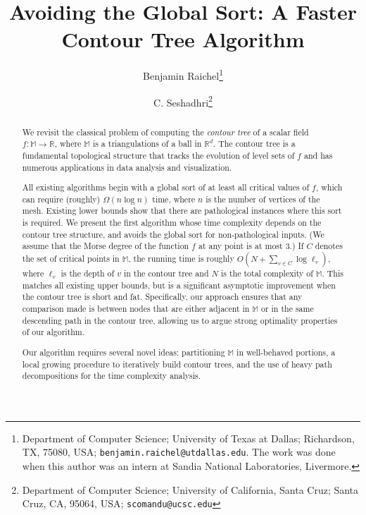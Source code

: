 \documentclass[11pt]{article}
\theoremstyle{definition}
\newcommand{\MM}{\mathbb{M}}
\newcommand{\RR}{\mathbb{R}}
\newcommand{\si}[1]{#1}
\begin{document}
\author{
  Benjamin Raichel\thanks{%
      Department of Computer Science; %
      University of Texas at Dallas; %
      Richardson, TX, 75080, USA; %
      \texttt{\si{benjamin.raichel}@\si{utdallas}.\si{edu}}.
  The work was done when this author was an intern
  at Sandia National Laboratories, Livermore.}
  \and
  C. Seshadhri\thanks{%
        Department of Computer Science; %
      University of California, Santa Cruz; %
      Santa Cruz, CA, 95064, USA; %
      \texttt{\si{scomandu}@\si{ucsc}.\si{edu}} %
  }
}

\title{%
Avoiding the Global Sort: 
\break A Faster Contour Tree Algorithm%
}
\date{}

\maketitle
\thispagestyle{empty}


\begin{abstract}
We revisit the classical problem of computing the \emph{contour tree}
of a scalar field $f:\MM \to \RR$, where $\MM$ 
is a triangulations of a ball in $\RR^d$.
The contour tree is a fundamental topological structure that tracks
the evolution of level sets of $f$ and 
has numerous applications in data analysis and visualization.

All existing algorithms begin with a global sort of at least all critical values of $f$,
which can require (roughly) $\Omega(n\log n)$ time, where $n$ is the number of vertices of the mesh.
Existing lower bounds show that there are pathological instances where this sort is required.
We present the first algorithm whose time complexity depends
on the contour tree structure, and avoids the global sort for non-pathological inputs. (We assume
that the Morse degree of the function $f$ at any
point is 
at most $3$.)
If $C$ denotes the set of critical points in $\MM$, the running time is
roughly $O(N+\sum_{v \in C} \log \ell_v)$, where $\ell_v$ is the depth of $v$ in the contour tree and $N$ is the total complexity of $\MM$.
This matches all existing upper bounds, but is a significant asymptotic improvement when the contour tree is short and fat.
Specifically, our approach ensures that any comparison made is between nodes that are either adjacent in $\MM$ 
or in the same descending path in the contour tree,
allowing us to argue strong optimality properties of our algorithm.

Our algorithm requires several novel ideas: partitioning $\MM$ in well-behaved portions, 
a local growing procedure to iteratively build contour trees, and the use of heavy path 
decompositions for the time complexity analysis. 
\end{abstract}
\end{document}
